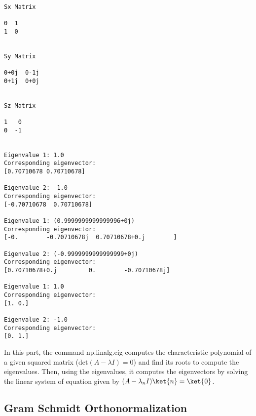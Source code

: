 \documentclass[11pt]{article}
\begin{document}
    \begin{Verbatim}[commandchars=\\\{\}]
Sx Matrix

0  1
1  0


Sy Matrix

0+0j  0-1j
0+1j  0+0j


Sz Matrix

1   0
0  -1


Eigenvalue 1: 1.0
Corresponding eigenvector:
[0.70710678 0.70710678]

Eigenvalue 2: -1.0
Corresponding eigenvector:
[-0.70710678  0.70710678]

Eigenvalue 1: (0.9999999999999996+0j)
Corresponding eigenvector:
[-0.        -0.70710678j  0.70710678+0.j        ]

Eigenvalue 2: (-0.9999999999999999+0j)
Corresponding eigenvector:
[0.70710678+0.j         0.        -0.70710678j]

Eigenvalue 1: 1.0
Corresponding eigenvector:
[1. 0.]

Eigenvalue 2: -1.0
Corresponding eigenvector:
[0. 1.]

    \end{Verbatim}

    In this part, the command np.linalg.eig computes the characteristic
polynomial of a given squared matrix
(\(\mathrm{det}\left(A-\lambda I\right)=0\)) and find its roots to
compute the eigenvalues. Then, using the eigenvalues, it computes the
eigenvectors by solving the linear system of equation given by
\((A-\lambda_n I)\ket{n}=\ket{0}\).

    \hypertarget{gram-schmidt-orthonormalization}{%
\subsection{Gram Schmidt
Orthonormalization}\label{gram-schmidt-orthonormalization}}
\end{document}
